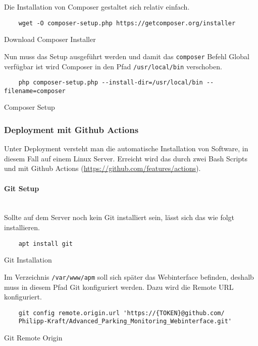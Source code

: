 Die Installation von Composer gestaltet sich relativ einfach.

\begin{listing}[H]
  \begin{verbatim}
    wget -O composer-setup.php https://getcomposer.org/installer
  \end{verbatim}
  \caption{Download Composer Installer}
\end{listing}

Nun muss das Setup ausgeführt werden und damit das \verb|composer| Befehl Global verfügbar ist wird Composer in den Pfad \verb|/usr/local/bin| verschoben.

\begin{listing}[H]
  \begin{verbatim}
    php composer-setup.php --install-dir=/usr/local/bin --filename=composer
  \end{verbatim}
  \caption{Composer Setup}
\end{listing}


\subsubsection{Deployment mit Github Actions}
Unter Deployment versteht man die automatische Installation von Software, in diesem Fall auf einem Linux Server. Erreicht wird das durch zwei Bash Scripts und mit Github Actions (\url{https://github.com/features/actions}).

\paragraph{Git Setup}\mbox{}\\

Sollte auf dem Server noch kein Git installiert sein, lässt sich das wie folgt
installieren.

\begin{listing}[H]
  \begin{verbatim}
    apt install git
  \end{verbatim}
  \caption{Git Installation}
\end{listing}

Im Verzeichnis \verb|/var/www/apm| soll sich später das Webinterface befinden,
deshalb muss in diesem Pfad Git konfiguriert werden. Dazu wird die Remote URL
konfiguriert.

\begin{listing}[H]
  \begin{verbatim}
    git config remote.origin.url 'https://{TOKEN}@github.com/
    Philipp-Kraft/Advanced_Parking_Monitoring_Webinterface.git'
  \end{verbatim}
  \caption{Git Remote Origin}
\end{listing}

